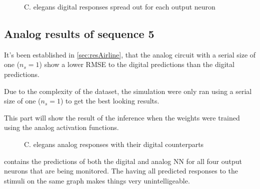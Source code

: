 \begin{figure}[H]
  \centering
  \begin{minipage}{\columnwidth}
    \hfill
  \end{minipage}
  \begin{minipage}{\columnwidth}
    \hfill
  \end{minipage}
  \caption{\ac{C. elegans} digital responses spread out for each output neuron}
  \label{graph:digital15Celegans}
\end{figure}

\subsection{Analog results of sequence 5}
\label{subsec:analog5Celegans}

It's been established in \cref{sec:resAirline}, that the analog circuit with a serial size of one ($n_s=1$) show a lower \ac{RMSE} to the digital predictions than the digital predictions.

Due to the complexity of the dataset, the simulation were only ran using a serial size of one ($n_s=1$) to get the best looking results.

This part will show the result of the inference when the weights were trained using the analog activation functions.

\begin{figure}[H]
  \centering
  
  \caption{\acs{C. elegans} analog responses with their digital counterparts}
  \label{graph:celegansAnalog0}
\end{figure}

 contains the predictions of both the digital and analog \ac{NN} for all four output neurons that are being monitored. The having all predicted responses to the stimuli on the same graph makes things very unintelligeable.

